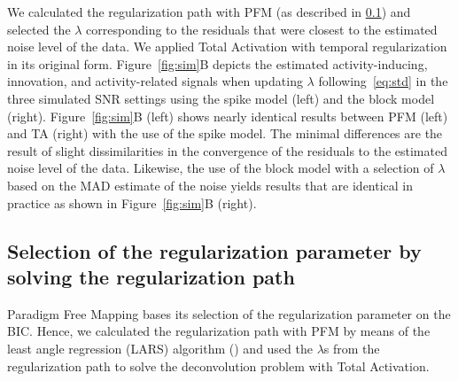 
We calculated the regularization path with PFM (as described in \ref{sec:regpath}) and selected the \(\lambda\) corresponding to the residuals that were closest to the estimated noise level of the data. We applied Total Activation with temporal regularization in its original form. Figure~\ref{fig:sim}B depicts the estimated activity-inducing, innovation, and activity-related signals when updating \(\lambda\) following~\eqref{eq:std} in the three simulated SNR settings using the spike model (left) and the block model (right). Figure~\ref{fig:sim}B (left) shows nearly identical results between PFM (left) and TA (right) with the use of the spike model. The minimal differences are the result of slight dissimilarities in the convergence of the residuals to the estimated noise level of the data. Likewise, the use of the block model with a selection of \(\lambda\) based on the MAD estimate of the noise yields results that are identical in practice as shown in Figure~\ref{fig:sim}B (right).

\subsection{Selection of the regularization parameter by solving the regularization path}
\label{sec:regpath}

Paradigm Free Mapping bases its selection of the regularization parameter on the BIC. Hence, we calculated the regularization path with PFM by means of the least angle regression (LARS) algorithm (\citealt{efron2004LeastAngleRegression}) and used the \(\lambda\)s from the regularization path to solve the deconvolution problem with Total Activation.

